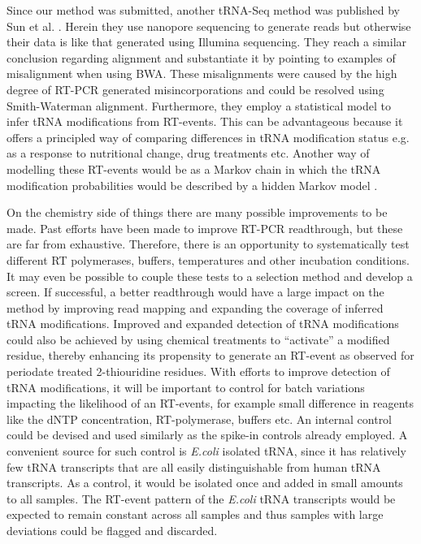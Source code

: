 Since our method was submitted, another tRNA-Seq method was published by Sun et al. \cite{Sun2023-sx}.
Herein they use nanopore sequencing to generate reads but otherwise their data is like that generated using Illumina sequencing.
They reach a similar conclusion regarding alignment and substantiate it by pointing to examples of misalignment when using BWA.
These misalignments were caused by the high degree of RT-PCR generated misincorporations and could be resolved using Smith-Waterman alignment.
Furthermore, they employ a statistical model to infer tRNA modifications from RT-events.
This can be advantageous because it offers a principled way of comparing differences in tRNA modification status e.g. as a response to nutritional change, drug treatments etc.
Another way of modelling these RT-events would be as a Markov chain in which the tRNA modification probabilities would be described by a hidden Markov model \cite{durbin1998biological}.

On the chemistry side of things there are many possible improvements to be made.
Past efforts have been made to improve RT-PCR readthrough, but these are far from exhaustive.
Therefore, there is an opportunity to systematically test different RT polymerases, buffers, temperatures and other incubation conditions.
It may even be possible to couple these tests to a selection method and develop a screen.
If successful, a better readthrough would have a large impact on the method by improving read mapping and expanding the coverage of inferred tRNA modifications.
Improved and expanded detection of tRNA modifications could also be achieved by using chemical treatments to ``activate'' a modified residue, thereby enhancing its propensity to generate an RT-event as observed for periodate treated 2-thiouridine residues.
With efforts to improve detection of tRNA modifications, it will be important to control for batch variations impacting the likelihood of an RT-events, for example small difference in reagents like the dNTP concentration, RT-polymerase, buffers etc.
An internal control could be devised and used similarly as the spike-in controls already employed.
A convenient source for such control is \textit{E.coli} isolated tRNA, since it has relatively few tRNA transcripts that are all easily distinguishable from human tRNA transcripts.
As a control, it would be isolated once and added in small amounts to all samples.
The RT-event pattern of the \textit{E.coli} tRNA transcripts would be expected to remain constant across all samples and thus samples with large deviations could be flagged and discarded.

